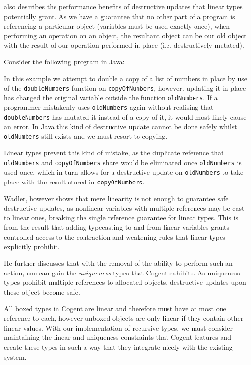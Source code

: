 \citet{LinearTypesChangeTheWorld} also describes the performance benefits of destructive updates
that linear types potentially grant. As we have a guarantee that no other part of a program is
referencing a particular object (variables must be used exactly once), when performing
an operation on an object, the resultant object can be our old object with the result
of our operation performed in place (i.e. destructively mutated).

Consider the following program in Java:



In this example we attempt to double a copy of a list of numbers in place by use of the \verb|doubleNumbers|
function on \verb|copyOfNumbers|, however, updating it in place has changed the original variable outside
the function \verb|oldNumbers|. If a programmer mistakenly uses \verb|oldNumbers| again without realising that
\verb|doubleNumbers| has mutated it instead of a copy of it, it would most likely cause an error. In 
Java this kind of destructive update cannot be done safely whilst \verb|oldNumbers| still exists and we
must resort to copying.

Linear types prevent this kind of mistake, as the duplicate reference that
\verb|oldNumbers| and \verb|copyOfNumbers| share would be eliminated once \verb|oldNumbers| is used once,
which in turn allows for a destructive update on \verb|oldNumbers| to take place with the result stored in
\verb|copyOfNumbers|.

Wadler, however shows that mere linearity is not enough to guarantee safe destructive updates, as nonlinear
variables with multiple references may be cast to linear ones, breaking the single reference guarantee
for linear types. This is from the result that adding typecasting to and from linear variables grants 
controlled access to the contraction and weakening rules that linear types explicitly prohibit.

He further discusses that with the removal of the ability to perform such an action,
one can gain the \textit{uniqueness} types that Cogent exhibits. 
As uniqueness types prohibit multiple references to allocated objects, 
destructive updates upon these object become safe.

All boxed types in Cogent are linear and therefore must have at most one reference to each,
however unboxed objects are only linear if they contain other linear values.
With our implementation of recursive types, we must consider maintaining the linear and uniqueness constraints
that Cogent features and create these types in such a way that they integrate nicely with the existing
system.
